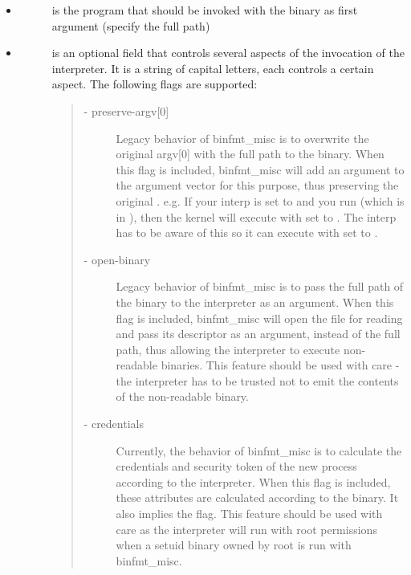 \documentclass[a4paper,8pt,english]{sphinxmanual}
\begin{document}
\begin{itemize}
\begin{description}
\end{description}

\item {} \begin{description}
\item[{}] \leavevmode
is the program that should be invoked with the binary as first
argument (specify the full path)

\end{description}

\item {} \begin{description}
\item[{}] \leavevmode
is an optional field that controls several aspects of the invocation
of the interpreter. It is a string of capital letters, each controls a
certain aspect. The following flags are supported:
\begin{quote}
\begin{description}
\item[{ - preserve-argv{[}0{]}}] \leavevmode
Legacy behavior of binfmt\_misc is to overwrite
the original argv{[}0{]} with the full path to the binary. When this
flag is included, binfmt\_misc will add an argument to the argument
vector for this purpose, thus preserving the original .
e.g. If your interp is set to  and you run 
(which is in ), then the kernel will execute
 with  set to .  The interp has to be aware of this so it can
execute 
with  set to \code{{[}"blah"{]}}.

\item[{ - open-binary}] \leavevmode
Legacy behavior of binfmt\_misc is to pass the full path
of the binary to the interpreter as an argument. When this flag is
included, binfmt\_misc will open the file for reading and pass its
descriptor as an argument, instead of the full path, thus allowing
the interpreter to execute non-readable binaries. This feature
should be used with care - the interpreter has to be trusted not to
emit the contents of the non-readable binary.

\item[{ - credentials}] \leavevmode
Currently, the behavior of binfmt\_misc is to calculate
the credentials and security token of the new process according to
the interpreter. When this flag is included, these attributes are
calculated according to the binary. It also implies the  flag.
This feature should be used with care as the interpreter
will run with root permissions when a setuid binary owned by root
is run with binfmt\_misc.


\end{description}
\end{quote}
\end{description}
\end{itemize}
\end{document}
